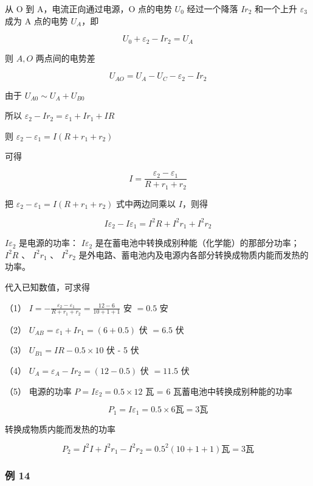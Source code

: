 从 O 到 A，电流正向通过电源，O 点的电势 \(U_{0}\) 经过一个降落
\(Ir_{2}\) 和一个上升 \(\varepsilon_{3}\) 成为 A 点的电势 \(U_{A}\)，即

\[
U_{0} + \varepsilon_{2} - I r_{2} = U_{A}
\]

则 \(A, O\) 两点间的电势差

\[
U_{A O} = U_{A} - U_{C} - \varepsilon_{2} - I r_{2}
\]

由于 \(U_{A0} \sim U_{A} + U_{B0}\)

所以 \(\varepsilon_{2} - Ir_{2} = \varepsilon_{1} + Ir_{1} + IR\)

则 \(\varepsilon_{2} - \varepsilon_{1} = I(R + r_{1} + r_{2})\)

可得

\[
I = \frac{\varepsilon_{2} - \varepsilon_{1}}{R + r_{1} + r_{2}}
\]

把 \(\varepsilon_{2} - \varepsilon_{1} = I(R + r_{1} + r_{2})\)
式中两边同乘以 \(I\)，则得

\[
I \varepsilon_{2} - I \varepsilon_{1} = I^{2} R + I^{2} r_{1} + I^{2} r_{2}
\]

\(I\varepsilon_{2}\) 是电源的功率： \(I\varepsilon_{2}\)
是在蓄电池中转换成别种能（化学能）的那部分功率； \(I^{2}R\) 、
\(I^{2}r_{1}\) 、 \(I^{2}r_{2}\)
是外电路、蓄电池内及电源内各部分转换成物质内能而发热的功率。

代入已知数值，可求得

（1）
\(I = -\frac{\varepsilon_2 - \varepsilon_1}{R + r_1 + r_2} = \frac{12 - 6}{10 + 1 + 1}\)
安 \(= 0.5\) 安

（2） \(U_{AB} = \varepsilon_1 + Ir_1 = (6 + 0.5)\) 伏 \(= 6.5\) 伏

（3） \(U_{B1} = IR - 0.5 \times 10\) 伏 - 5 伏

（4） \(U_{A} = \varepsilon_{A} - Ir_{2} = (12 - 0.5)\) 伏 \(= 11.5\) 伏

（5） 电源的功率 \(P = I\varepsilon_{2} = 0.5 \times 12\) 瓦 = 6
瓦蓄电池中转换成别种能的功率

\[
P_{1} = I \varepsilon_{1} = 0.5 \times 6 \text{瓦} = 3 \text{瓦}
\]

转换成物质内能而发热的功率

\[
P_{2} = I^{2} I + I^{2} r_{1} - I^{2} r_{2} = 0.5^{2} (10 + 1 + 1) \text{瓦} = 3 \text{瓦}
\]

\subsubsection{例 14}\label{ux4f8b-14-1}

